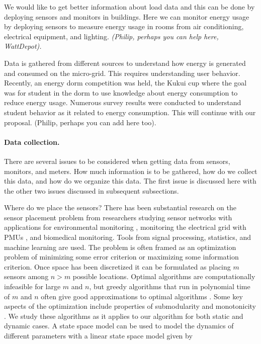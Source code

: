 We would like to get better information about load data and this can be
done by deploying sensors and monitors in buildings.  Here we can monitor
energy usage by deploying sensors to measure energy usage in rooms from air
conditioning, electrical equipment, and lighting.  {\em (Philip, perhaps you can
help here, WattDepot).}
 
Data is gathered from different sources to understand how energy is
generated and consumed on the micro-grid.  This requires understanding user
behavior.  Recently, an energy dorm competition was held, the Kukui cup
where the goal was for student in the dorm to use knowledge about energy
consumption to reduce energy usage.  Numerous survey results were conducted
to understand student behavior as it related to energy consumption.  This
will continue with our proposal.  (Philip, perhaps you can add here too).
 
\paragraph{Data collection.}

There are several issues to be considered when getting data from sensors, monitors, and meters.
How much information is to be gathered, how do we collect this data, and how do we organize
this data.  The first issue is discussed here with the other two issues discussed in subsequent
subsections.

Where do we place the sensors?  There has been substantial research on the
sensor placement problem from researchers studying sensor networks with
applications for environmental monitoring \cite{dhillon2,dhillon3},
monitoring the electrical grid with PMUs \cite{chen-abur,xu-abur}, and
biomedical monitoring.  Tools from signal processing, statistics, and
machine learning are used.  The problem is often framed as an optimization
problem of minimizing some error criterion or maximizing some information
criterion.  Once space has been discretized it can be formulated as placing
$m$ sensors among $n>m$ possible locations.  Optimal algorithms are
computationally infeasible for large $m$ and $n$, but greedy algorithms
that run in polynomial time of $m$ and $n$ often give good approximations
to optimal algorithms \cite{li-negi-ilic,krause-singh-guestrin}.  Some key
aspects of the optimization include properties of submodularity and
monotonicity \cite{nwf}.  We study these algorithms as it applies to our
algorithm for both static and dynamic cases.  A state space model can be
used to model the dynamics of different parameters with a linear state
space model given by

